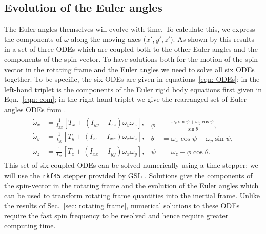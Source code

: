 \documentclass[../full_thesis/full_thesis.tex]{subfiles}
\begin{document}
\subsection{Evolution of the Euler angles}
The Euler angles themselves will evolve with time. To calculate this, we express
the components of $\omega$ along the moving axes ($x', y', z')$. As shown by
\citet{Landau1969} this results in a set of three ODEs which are coupled both to
the other Euler angles and the components of the spin-vector. To have solutions
both for the motion of the spin-vector in the rotating frame and the Euler
angles we need to solve all six ODEs together. To be specific, the six ODEs are
given in equations~\eqref{eqn: ODEs}: in the left-hand triplet is the
components of the Euler rigid body equations first given in Eqn.~\eqref{eqn:
eom}; in the right-hand triplet we give the rearranged set of Euler angles ODEs
from \citet{Landau1969}.
\begin{align}
\begin{split}
\dot{\omega}_{x} & = \frac{1}{I_{xx}}\left[T_{x} +
                      \left(I_{yy} - I_{zz}\right) \omega_{y} \omega_{z}\right],
\\
\dot{\omega}_{y} & = \frac{1}{I_{yy}}\left[T_{y} +
                      \left(I_{zz} - I_{xx}\right) \omega_{x} \omega_{z}\right],
\\
\dot{\omega}_{z} & =\frac{1}{I_{zz}}\left[T_{z} +
                      \left(I_{xx} - I_{yy}\right) \omega_{x} \omega_{y}\right],
\end{split}
\begin{split}
\dot{\phi} & = \frac{\omega_{x} \sin \psi + \omega_{y} \cos \psi}{\sin \theta},\\
\dot{\theta} & = \omega_{x} \cos \psi - \omega_{y} \sin \psi,\\
\dot{\psi} & = \omega_{z} - \dot{\phi} \cos \theta.
\end{split}
\label{eqn: ODEs}
\end{align}
This set of six coupled ODEs can be solved numerically using a time stepper; we
will use the \texttt{rkf45} stepper provided by GSL \citep{gough2009gnu}.
Solutions give the components of the spin-vector in the rotating frame and the
evolution of the Euler angles which can be used to transform rotating frame
quantities into the inertial frame. Unlike the results of Sec.~\ref{sec:
rotating frame}, numerical solutions to these ODEs require the fast spin frequency
to be resolved and hence require greater computing time.

\end{document}
